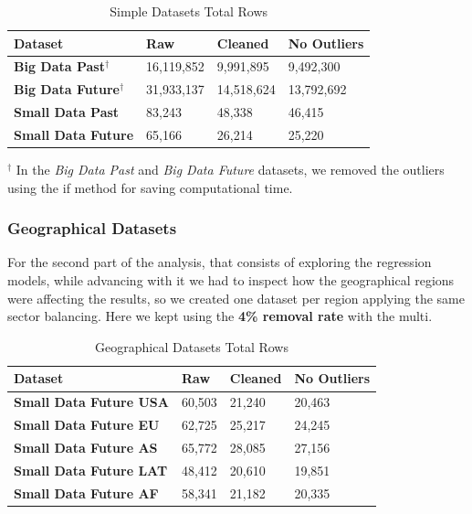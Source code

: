 \documentclass[11pt,english,a4paper,hidelinks]{book}
\begin{document}
\begin{table}[H]
    \centering
    \caption{Simple Datasets Total Rows}
    \begin{tabular}{|l|l|l|l|}
        \hline  
        \textbf{Dataset} & \textbf{Raw} & \textbf{Cleaned} & \textbf{No Outliers} \\
        \hline
        \textbf{Big Data Past$^\dagger$} & 16,119,852 & 9,991,895 & 9,492,300 \\
        \hline
        \textbf{Big Data Future$^\dagger$} & 31,933,137 & 14,518,624 & 13,792,692 \\
        \hline 
        \textbf{Small Data Past} & 83,243 & 48,338 & 46,415 \\
        \hline
        \textbf{Small Data Future} & 65,166 & 26,214 & 25,220 \\
        \hline
        \end{tabular}
    \label{tab:simple_datasets_rows}
\end{table}

\noindent $^\dagger$ In the \textit{Big Data Past} and \textit{Big Data Future} datasets, we removed the outliers using the \acrshort{if} method for saving computational time.

\subsubsection{Geographical Datasets}

\noindent For the second part of the analysis, that consists of exploring the regression models, while advancing with it we had to inspect how the geographical regions were affecting the results, so we created one dataset per region applying the same sector balancing. Here  we kept using the \textbf{4\% removal rate} with the \acrshort{multi}.

\begin{table}[H]
    \centering
    \caption{Geographical Datasets Total Rows}
    \begin{tabular}{|l|l|l|l|}
        \hline  
        \textbf{Dataset} & \textbf{Raw} & \textbf{Cleaned} & \textbf{No Outliers} \\
        \hline
        \textbf{Small Data Future USA} & 60,503 & 21,240 & 20,463 \\
        \hline
        \textbf{Small Data Future EU} & 62,725 & 25,217 & 24,245 \\
        \hline        
        \textbf{Small Data Future AS} & 65,772 & 28,085 & 27,156\\
        \hline
        \textbf{Small Data Future LAT} & 48,412 & 20,610 & 19,851 \\
        \hline
        \textbf{Small Data Future AF} & 58,341 & 21,182 & 20,335 \\
        \hline
        \end{tabular}
    \label{tab:geographical_datasets_rows}
\end{table}
\end{document}
